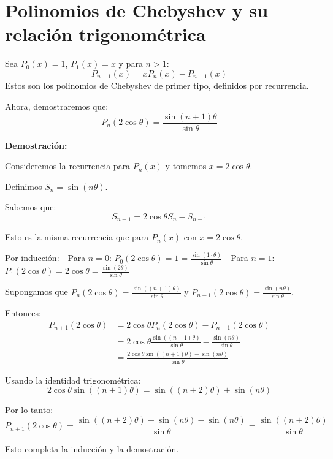 \section{Polinomios de Chebyshev y su relación trigonométrica}

Sea $P_0(x) = 1$, $P_1(x) = x$ y para $n > 1$:
\[
    P_{n+1}(x) = x P_n(x) - P_{n-1}(x)
\]
Estos son los polinomios de Chebyshev de primer tipo, definidos por recurrencia.

Ahora, demostraremos que:
\[
    P_n(2 \cos \theta) = \frac{\sin(n+1)\theta}{\sin \theta}
\]

\textbf{Demostración:}

Consideremos la recurrencia para $P_n(x)$ y tomemos $x = 2 \cos \theta$.

Definimos $S_n = \sin(n\theta)$.

Sabemos que:
\[
    S_{n+1} = 2 \cos \theta S_n - S_{n-1}
\]

Esto es la misma recurrencia que para $P_n(x)$ con $x = 2 \cos \theta$.

Por inducción:
- Para $n=0$: $P_0(2\cos\theta) = 1 = \frac{\sin(1\cdot\theta)}{\sin\theta}$
- Para $n=1$: $P_1(2\cos\theta) = 2\cos\theta = \frac{\sin(2\theta)}{\sin\theta}$

Supongamos que $P_n(2\cos\theta) = \frac{\sin((n+1)\theta)}{\sin\theta}$ y $P_{n-1}(2\cos\theta) = \frac{\sin(n\theta)}{\sin\theta}$.

Entonces:
\[
\begin{align*}
P_{n+1}(2\cos\theta) &= 2\cos\theta P_n(2\cos\theta) - P_{n-1}(2\cos\theta) \\
&= 2\cos\theta \frac{\sin((n+1)\theta)}{\sin\theta} - \frac{\sin(n\theta)}{\sin\theta} \\
&= \frac{2\cos\theta \sin((n+1)\theta) - \sin(n\theta)}{\sin\theta}
\end{align*}
\]

Usando la identidad trigonométrica:
\[
    2\cos\theta \sin((n+1)\theta) = \sin((n+2)\theta) + \sin(n\theta)
\]

Por lo tanto:
\[
    P_{n+1}(2\cos\theta) = \frac{\sin((n+2)\theta) + \sin(n\theta) - \sin(n\theta)}{\sin\theta} = \frac{\sin((n+2)\theta)}{\sin\theta}
\]

Esto completa la inducción y la demostración.
